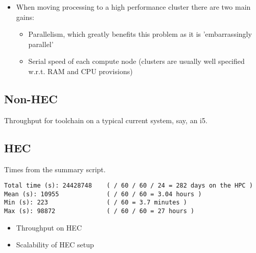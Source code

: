 \begin{itemize}
    \item When moving processing to a high performance cluster there are two main gains:
        \begin{itemize}
            \item Parallelism, which greatly benefits this problem as it is 'embarrassingly parallel'
            \item Serial speed of each compute node (clusters are usually well specified w.r.t. RAM and CPU provisions)
        \end{itemize}
\end{itemize}

\subsection{Non-HEC}
Throughput for toolchain on a typical current system, say, an i5.  


\subsection{HEC}
Times from the summary script.

{\small
\begin{verbatim}
Total time (s): 24428748    ( / 60 / 60 / 24 = 282 days on the HPC )
Mean (s): 10955             ( / 60 / 60 = 3.04 hours )
Min (s): 223                ( / 60 = 3.7 minutes )
Max (s): 98872              ( / 60 / 60 = 27 hours )
\end{verbatim}
}

\begin{itemize}
    \item Throughput on HEC
    \item Scalability of HEC setup
\end{itemize}

